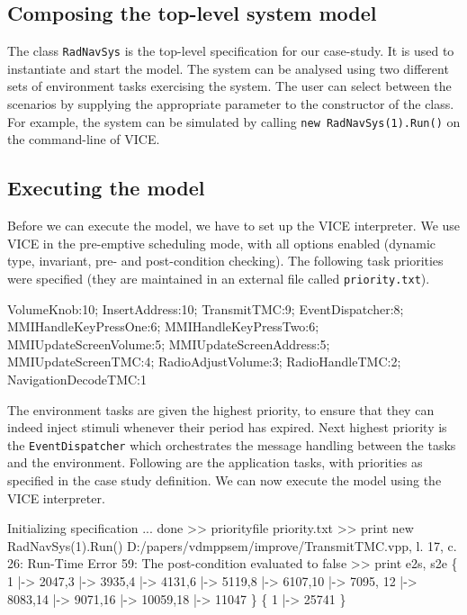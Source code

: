 

\subsection{Composing the top-level system model}

The class \verb+RadNavSys+ is the top-level specification for our case-study.
It is used to instantiate and start the model. The system can be analysed
using two different sets of environment tasks exercising the system. The
user can select between the scenarios by supplying the appropriate parameter
to the constructor of the class. For example, the system can be simulated
by calling \verb+new RadNavSys(1).Run()+ on the command-line of VICE.



\subsection{Executing the model}

Before we can execute the model, we have to set up the VICE interpreter.
We use VICE in the pre-emptive scheduling mode, with all options enabled
(dynamic type, invariant, pre- and post-condition checking). The following
task priorities were specified (they are maintained in an external file
called \verb+priority.txt+).

\begin{vpp}
VolumeKnob:10;
InsertAddress:10;
TransmitTMC:9;
EventDispatcher:8;
MMIHandleKeyPressOne:6;
MMIHandleKeyPressTwo:6;
MMIUpdateScreenVolume:5;
MMIUpdateScreenAddress:5;
MMIUpdateScreenTMC:4;
RadioAdjustVolume:3;
RadioHandleTMC:2;
NavigationDecodeTMC:1
\end{vpp}

The environment tasks are given the highest priority, to ensure that they
can indeed inject stimuli whenever their period has expired. Next highest
priority is the \verb+EventDispatcher+ which orchestrates the message
handling between the tasks and the environment. Following are the
application tasks, with priorities as specified in the case study
definition. We can now execute the model using the VICE interpreter.

\begin{vpp}
Initializing specification ...
done
>> priorityfile priority.txt
>> print new RadNavSys(1).Run()
D:/papers/vdmppsem/improve/TransmitTMC.vpp, l. 17, c. 26:
  Run-Time Error 59: The post-condition evaluated to false
>> print e2s, s2e
\{ 1 |-> 2047,3 |-> 3935,4 |-> 4131,6 |-> 5119,8 |-> 6107,10 |-> 7095,
  12 |-> 8083,14 |-> 9071,16 |-> 10059,18 |-> 11047 \}
\{ 1 |-> 25741 \}
\end{vpp}

